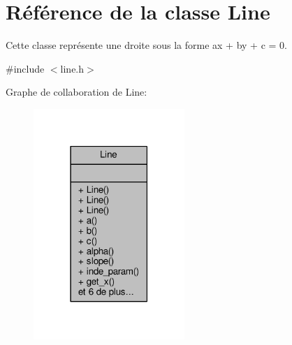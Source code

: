 \hypertarget{classLine}{\section{Référence de la classe Line}
\label{classLine}
}


Cette classe représente une droite sous la forme ax + by + c = 0.  




{\ttfamily \#include $<$line.\+h$>$}



Graphe de collaboration de Line\+:\nopagebreak
\begin{figure}[H]
\begin{center}
\leavevmode
\includegraphics[width=162pt]{de/d2f/classLine__coll__graph}
\end{center}
\end{figure}
